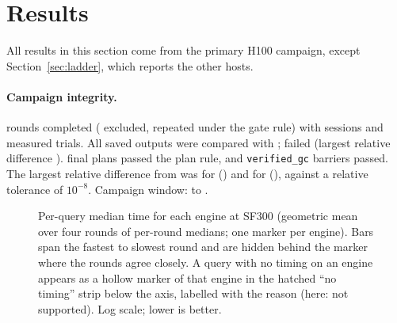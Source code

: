 \documentclass[11pt]{article}
\begin{document}
\section{Results}
\label{sec:results}


All results in this section come from the primary H100 campaign, except
Section~\ref{sec:ladder}, which reports the other hosts.

\paragraph{Campaign integrity.}  rounds completed
( excluded,  repeated under the gate rule) with
 sessions and 
measured trials. All  saved outputs were compared
with \polarscpu{};  failed (largest relative
difference ). 
\sparkgpu{} final plans passed the plan rule, and
 \texttt{verified\_gc} barriers passed. The
largest relative difference from \polarscpu{} was
 for \polarsgpu{}
() and
 for \sparkgpu{}
(), against a relative tolerance of
$10^{-8}$.
Campaign window:  to .

\begin{figure}[t]
\centering
{}
\caption{Per-query median time for each engine at SF300 (geometric mean over
four rounds of per-round medians; one marker per engine). Bars span the fastest
to slowest round and are hidden behind the marker where the rounds agree
closely. A query with no timing on an engine appears as a hollow marker of
that engine in the hatched ``no timing'' strip below the axis, labelled with
the reason (here: not supported). Log scale; lower is better. \chartnote}
\label{fig:f10}
\end{figure}
\end{document}
